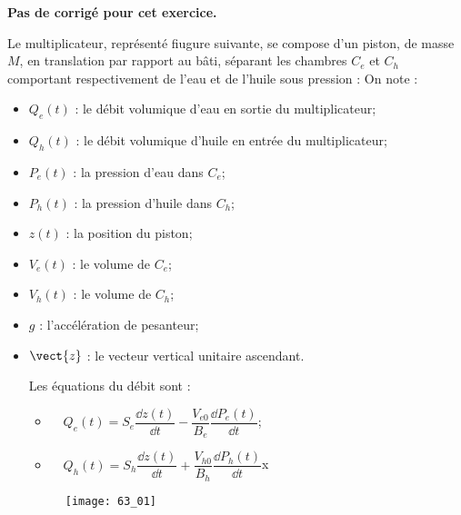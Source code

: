 \normaltrue
\correctionfalse


\setcounter{numques}{0}
\ifcorrection
\else
\textbf{Pas de corrigé pour cet exercice.}
\fi



Le multiplicateur, représenté fiugure suivante, se compose d’un piston, de masse $M$, en translation par rapport au bâti, séparant les chambres $C_e$ et $C_h$ comportant respectivement de l’eau et de l’huile sous pression :
On note :
\begin{itemize}
\item $Q_e(t)$ : le débit volumique d’eau en sortie du multiplicateur;
\item $Q_h(t)$ : le débit volumique d’huile en entrée du multiplicateur;
\item $P_e(t)$ : la pression d’eau dans $C_e$;
\item $P_h(t)$ : la pression d’huile dans $C_h$;
\item $z(t)$ : la position du piston;
\item $V_e(t)$ : le volume de $C_e$;
\item $V_h(t)$ : le volume de $C_h$;
\item $g$ : l’accélération de pesanteur;
\item $\vect{z}$ : le vecteur vertical unitaire ascendant.

Les équations du débit sont :
\begin{itemize}
\item $\quad Q_e (t)=S_e\dfrac{\dd z(t)}{\dd t}-\dfrac{V_{e0}}{B_e}  \dfrac{\dd P_e (t)}{\dd t}$;
\item $\quad Q_h (t)=S_h\dfrac{\dd z(t)}{\dd t}+\dfrac{V_{h0}}{B_h}  \dfrac{\dd P_h (t)}{\dd t}$x
\end{itemize}




\begin{figure}[H]
\centering
\texttt{[image: 63\_01]}
\end{figure}


%


\end{itemize}
